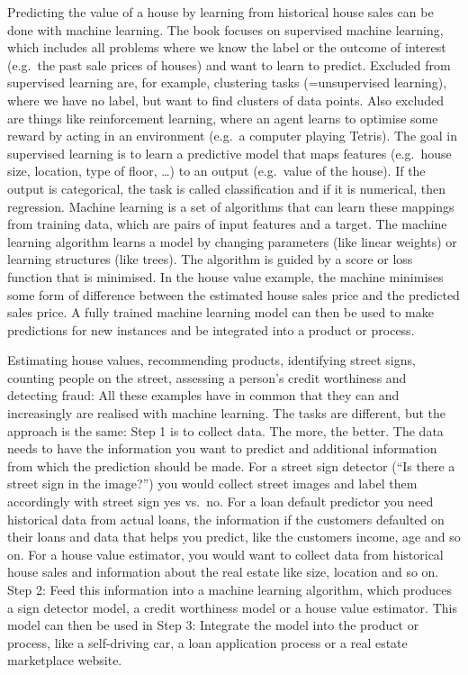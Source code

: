 \documentclass[12pt,]{krantz}
\theoremstyle{definition}
\theoremstyle{definition}
\theoremstyle{definition}
\theoremstyle{remark}
\begin{document}
Predicting the value of a house by learning from historical house sales
can be done with machine learning. The book focuses on supervised
machine learning, which includes all problems where we know the label or
the outcome of interest (e.g.~the past sale prices of houses) and want
to learn to predict. Excluded from supervised learning are, for example,
clustering tasks (=unsupervised learning), where we have no label, but
want to find clusters of data points. Also excluded are things like
reinforcement learning, where an agent learns to optimise some reward by
acting in an environment (e.g.~a computer playing Tetris). The goal in
supervised learning is to learn a predictive model that maps features
(e.g.~house size, location, type of floor, \ldots{}) to an output
(e.g.~value of the house). If the output is categorical, the task is
called classification and if it is numerical, then regression. Machine
learning is a set of algorithms that can learn these mappings from
training data, which are pairs of input features and a target. The
machine learning algorithm learns a model by changing parameters (like
linear weights) or learning structures (like trees). The algorithm is
guided by a score or loss function that is minimised. In the house value
example, the machine minimises some form of difference between the
estimated house sales price and the predicted sales price. A fully
trained machine learning model can then be used to make predictions for
new instances and be integrated into a product or process.

Estimating house values, recommending products, identifying street
signs, counting people on the street, assessing a person's credit
worthiness and detecting fraud: All these examples have in common that
they can and increasingly are realised with machine learning. The tasks
are different, but the approach is the same: Step 1 is to collect data.
The more, the better. The data needs to have the information you want to
predict and additional information from which the prediction should be
made. For a street sign detector (``Is there a street sign in the
image?'') you would collect street images and label them accordingly
with street sign yes vs.~no. For a loan default predictor you need
historical data from actual loans, the information if the customers
defaulted on their loans and data that helps you predict, like the
customers income, age and so on. For a house value estimator, you would
want to collect data from historical house sales and information about
the real estate like size, location and so on. Step 2: Feed this
information into a machine learning algorithm, which produces a sign
detector model, a credit worthiness model or a house value estimator.
This model can then be used in Step 3: Integrate the model into the
product or process, like a self-driving car, a loan application process
or a real estate marketplace website.
\end{document}
